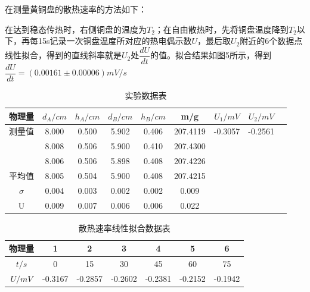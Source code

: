 \documentclass{article}
\begin{document}
在测量黄铜盘的散热速率的方法如下：


在达到稳态传热时，右侧铜盘的温度为$ T_2 $；在自由散热时，先将铜盘温度降到$ T_2 $以下，再每15s记录一次铜盘温度所对应的热电偶示数$ U $，最后取$ U_2 $附近的6个数据点线性拟合，得到的直线斜率就是$ U_2 $处$ \dfrac{dU}{dt} $的值。拟合结果如图5所示，得到	$ \dfrac{dU}{dt}=(0.00161\pm0.00006)mV/s$
\begin{table}
	\centering
	\caption{\heiti{}实验数据表}
	\begin{tabular}{ccccccccc}
		\toprule
		物理量&$ d_A/cm$&$ h_A/cm $&$ d_B/cm $&$ h_B/cm $&m/g&$ U_1/mV $&$ U_2/mV $\\
		\midrule
		测量值&8.000&0.500&5.902&0.406&207.4119&-0.3057&-0.2561\\
		      &8.008&0.506&5.900&0.410&207.4300\\
		      &8.006&0.506&5.898&0.408&207.4226\\
		平均值&8.005&0.504&5.900&0.408&207.4215\\
		$\sigma$&0.004&0.003&0.002&0.002&0.009\\
		U&0.009&0.007&0.006&0.006&0.022\\
		\bottomrule
	\end{tabular}
\end{table}
\begin{table}
	\centering
	\caption{\heiti{}散热速率线性拟合数据表}
	\begin{tabular}{ccccccc}
		\toprule
		物理量&1&2&3&4&5&6\\
		\midrule
		$ t/s $&0&15&30&45&60&75\\
		$ U/mV $&-0.3167&-0.2857&-0.2602&-0.2381&-0.2152&-0.1942\\
		\bottomrule
	\end{tabular}
\end{table} 
\end{document}
